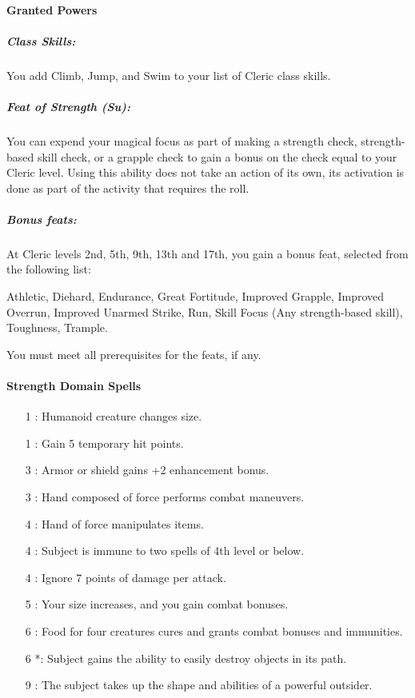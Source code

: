 \paragraph{Granted Powers}
\subparagraph{Class Skills:}
You add Climb, Jump, and Swim to your list of Cleric class skills.
\subparagraph{Feat of Strength (Su):}
You can expend your magical focus as part of making a strength check, strength-based skill check, or a grapple check to gain a bonus on the check equal to your Cleric level.
Using this ability does not take an action of its own, its activation is done as part of the activity that requires the roll.
\subparagraph{Bonus feats:}
At Cleric levels 2nd, 5th, 9th, 13th and 17th, you gain a bonus feat, selected from the following list:

Athletic, Diehard, Endurance, Great Fortitude, Improved Grapple, Improved Overrun, Improved Unarmed Strike, Run, Skill Focus (Any strength-based skill), Toughness, Trample.

You must meet all prerequisites for the feats, if any.
\paragraph{Strength Domain Spells}
\begin{itemize}
\item[1] : Humanoid creature changes size.
\item[1] : Gain 5 temporary hit points.
\item[3] : Armor or shield gains +2 enhancement bonus.
\item[3] : Hand composed of force performs combat maneuvers.
\item[4] : Hand of force manipulates items.
\item[4] : Subject is immune to two spells of 4th level or below.
\item[4] : Ignore 7 points of damage per attack.
\item[5] : Your size increases, and you gain combat bonuses.
\item[6] : Food for four creatures cures and grants combat bonuses and immunities.
\item[6] *: Subject gains the ability to easily destroy objects in its path.
\item[9] : The subject takes up the shape and abilities of a powerful outsider.
\end{itemize}
